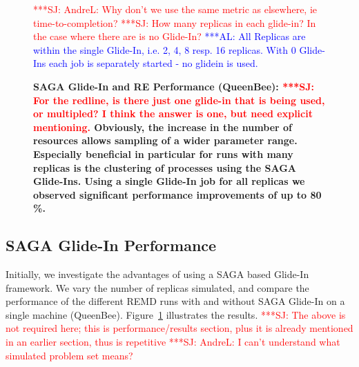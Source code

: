 \documentclass{rspublic}
\newcommand{\alnote}[1]{ {\textcolor{blue} { ***AL: #1 }}}
\newcommand{\jhanote}[1]{ {\textcolor{red} { ***SJ: #1 }}}
\newcommand{\alnote}[1]{}
\newcommand{\jhanote}[1]{}
\begin{document}
\begin{figure}[th]
  \centering
{}
  \caption{\footnotesize \bf SAGA Glide-In and RE Performance
    (QueenBee): \jhanote{For the redline, is there just one glide-in
      that is being used, or multipled? I think the answer is one, but
      need explicit mentioning.}  Obviously, the increase in the
    number of resources allows sampling of a wider parameter
    range. Especially beneficial in particular for runs with many
    replicas is the clustering of processes using the SAGA
    Glide-Ins. Using a single Glide-In job for all replicas we
    observed significant performance improvements of up to 80\,\%.}
  \jhanote{AndreL: Why don't we use the same metric as elsewhere, ie
    time-to-completion?}
  \jhanote{How many replicas in each glide-in? In the case where there
    are is no Glide-In?}  \alnote{All Replicas are within the single
    Glide-In, i.e. 2, 4, 8 resp. 16 replicas.  With 0 Glide-Ins each
    job is separately started - no glidein is used.}
    \label{fig:perf_remd_glidin}
\end{figure} 

\subsection{SAGA Glide-In Performance}

Initially, we investigate the advantages of using a SAGA based
Glide-In framework. We vary the number of replicas simulated, and
compare the performance of the different REMD runs with and without
SAGA Glide-In on a single machine (QueenBee).
Figure~\ref{fig:perf_remd_glidin} illustrates the results.
\jhanote{The above is not required here; this is performance/results
  section, plus it is already mentioned in an earlier section, thus is
  repetitive}
\jhanote{AndreL: I can't understand what simulated problem set means?}
\end{document}
